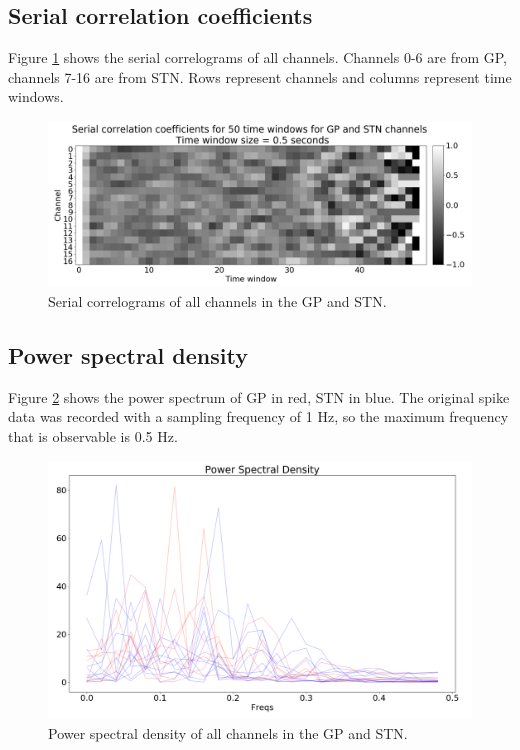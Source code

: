 \documentclass{kththesis}
\begin{document}
\subsection{Serial correlation coefficients}

Figure \ref{fig:corr3} shows the serial correlograms of all channels. Channels 0-6 are from GP, channels 7-16 are from STN.
Rows represent channels and columns represent time windows.

\begin{figure}[H]
    \centering
    \centerline{\includegraphics[width=1\textwidth]{images/spiking/autocorr_all.png}}
    \caption{Serial correlograms of all channels in the GP and STN.}
    \label{fig:corr3}
\end{figure}

\subsection{Power spectral density}

Figure \ref{fig:PS3} shows the power spectrum of GP in red, STN in blue.
The original spike data was recorded with a sampling frequency of 1 Hz, so the maximum frequency that is observable is 0.5 Hz.

\begin{figure}[H]
    \centering
    \centerline{\includegraphics[width=1\textwidth]{images/spiking/powerSpect_all.png}}
    \caption{Power spectral density of all channels in the GP and STN.}
    \label{fig:PS3}
\end{figure}
\end{document}
